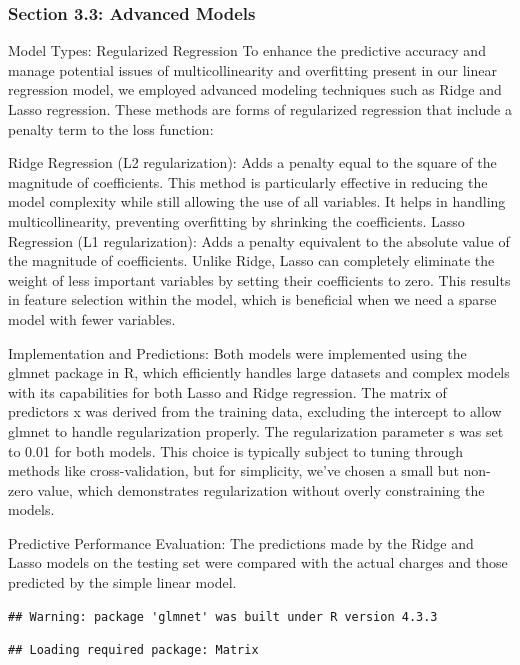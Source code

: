 \documentclass[
  12pt,
]{article}
\begin{document}
\subsubsection{Section 3.3: Advanced
Models}\label{section-3.3-advanced-models}

Model Types: Regularized Regression To enhance the predictive accuracy
and manage potential issues of multicollinearity and overfitting present
in our linear regression model, we employed advanced modeling techniques
such as Ridge and Lasso regression. These methods are forms of
regularized regression that include a penalty term to the loss function:

Ridge Regression (L2 regularization): Adds a penalty equal to the square
of the magnitude of coefficients. This method is particularly effective
in reducing the model complexity while still allowing the use of all
variables. It helps in handling multicollinearity, preventing
overfitting by shrinking the coefficients. Lasso Regression (L1
regularization): Adds a penalty equivalent to the absolute value of the
magnitude of coefficients. Unlike Ridge, Lasso can completely eliminate
the weight of less important variables by setting their coefficients to
zero. This results in feature selection within the model, which is
beneficial when we need a sparse model with fewer variables.

Implementation and Predictions: Both models were implemented using the
glmnet package in R, which efficiently handles large datasets and
complex models with its capabilities for both Lasso and Ridge
regression. The matrix of predictors x was derived from the training
data, excluding the intercept to allow glmnet to handle regularization
properly. The regularization parameter s was set to 0.01 for both
models. This choice is typically subject to tuning through methods like
cross-validation, but for simplicity, we've chosen a small but non-zero
value, which demonstrates regularization without overly constraining the
models.

Predictive Performance Evaluation: The predictions made by the Ridge and
Lasso models on the testing set were compared with the actual charges
and those predicted by the simple linear model.

\begin{verbatim}
## Warning: package 'glmnet' was built under R version 4.3.3
\end{verbatim}

\begin{verbatim}
## Loading required package: Matrix
\end{verbatim}
\end{document}
